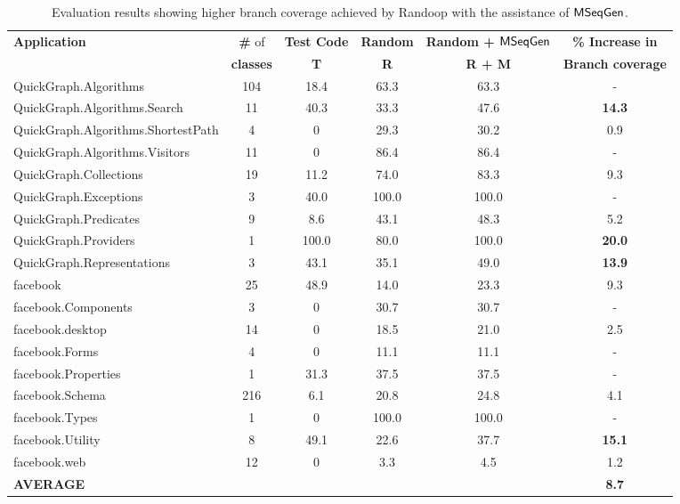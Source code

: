 \documentclass{sig-alternate}
\begin{document}
\setlength{\tabcolsep}{1pt}
\begin{table}[t]
\begin{SmallOut}
\begin{CodeOut}
\begin{center}
\begin {tabular} {|l|c|c|c|c|c|}
\hline
\textbf{Application} & \textbf{\#} of & \textbf{Test Code} & \textbf{Random} & \textbf{Random + $\textsf{MSeqGen} $} & \textbf{\% Increase in }\\
 & \textbf{classes} & \textbf{T} & \textbf{R} & \textbf{R + M} & \textbf{Branch coverage}\\
\hline
\hline QuickGraph.Algorithms & 104 & 18.4 & 63.3 & 63.3 & - \\
\hline QuickGraph.Algorithms.Search & 11 & 40.3 & 33.3 & 47.6 & \textbf{14.3} \\
\hline QuickGraph.Algorithms.ShortestPath & 4 & 0 & 29.3 & 30.2 & 0.9 \\
\hline QuickGraph.Algorithms.Visitors & 11 & 0 & 86.4 & 86.4 & - \\
\hline QuickGraph.Collections & 19 & 11.2 & 74.0 & 83.3 & 9.3 \\
\hline QuickGraph.Exceptions & 3 & 40.0 & 100.0 & 100.0 & - \\
\hline QuickGraph.Predicates & 9 & 8.6 & 43.1 & 48.3 & 5.2 \\
\hline QuickGraph.Providers & 1 & 100.0 & 80.0 & 100.0 & \textbf{20.0} \\
\hline QuickGraph.Representations & 3 & 43.1 & 35.1 & 49.0 & \textbf{13.9} \\
\hline facebook & 25 & 48.9 & 14.0 & 23.3 & 9.3 \\
\hline facebook.Components & 3 & 0 & 30.7 & 30.7 & - \\
\hline facebook.desktop & 14 & 0 & 18.5 & 21.0 & 2.5 \\
\hline facebook.Forms & 4 & 0 & 11.1 & 11.1 & - \\
\hline facebook.Properties & 1 & 31.3 & 37.5 & 37.5 & - \\
\hline facebook.Schema & 216 & 6.1 & 20.8 & 24.8 & 4.1 \\
\hline facebook.Types & 1 & 0 & 100.0 & 100.0 & - \\
\hline facebook.Utility & 8 & 49.1 & 22.6 & 37.7 & \textbf{15.1} \\
\hline facebook.web & 12 & 0 & 3.3 & 4.5 & 1.2 \\
\hline \textbf{AVERAGE} &  &  &  &  & \textbf{8.7} \\
\hline
\end{tabular}
\end{center}
\end{CodeOut}
\end{SmallOut}\vspace*{-4ex}
\centering \caption {\label{tab:premresults} Evaluation results showing higher branch coverage achieved by Randoop with the assistance of $\textsf{MSeqGen} $. }
\end{table}
\end{document}
